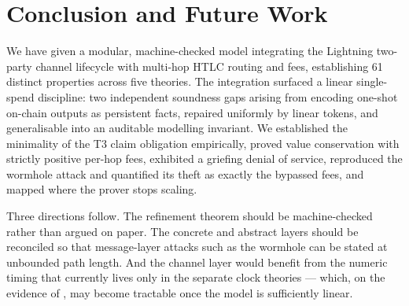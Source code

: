 \section{Conclusion and Future Work}

We have given a modular, machine-checked model integrating the Lightning
two-party channel lifecycle with multi-hop HTLC routing and fees, establishing
61 distinct properties across five theories. The integration surfaced a linear
single-spend discipline: two independent soundness gaps arising from encoding
one-shot on-chain outputs as persistent facts, repaired uniformly by linear
tokens, and generalisable into an auditable modelling invariant. We established
the minimality of the T3 claim obligation empirically, proved value
conservation with strictly positive per-hop fees, exhibited a griefing denial
of service, reproduced the wormhole attack and quantified its theft as exactly
the bypassed fees, and mapped where the prover stops scaling.

Three directions follow. The refinement theorem should be machine-checked
rather than argued on paper. The concrete and abstract layers should be
reconciled so that message-layer attacks such as the wormhole can be stated at
unbounded path length. And the channel layer would benefit from the numeric
timing that currently lives only in the separate clock theories --- which, on
the evidence of , may become tractable once the model is
sufficiently linear.
